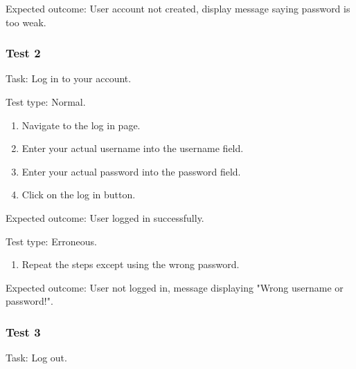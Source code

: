 {\sffamily Expected outcome:} User account not created, display
message saying password is too weak.\\

{\color{gray} \hrulefill}

\vspace{0.2cm}

\subsubsection{Test 2}

{\sffamily Task:} Log in to your account.\\

{\color{gray} \hrulefill}

{\sffamily Test type: Normal.}\\

\begin{enumerate}
  \item Navigate to the log in page.
  \item Enter your actual username into the username field.
  \item Enter your actual password into the password field.
  \item Click on the log in button.
\end{enumerate}

{\sffamily Expected outcome:} User logged in successfully. \\

{\color{gray} \hrulefill}

{\sffamily Test type: Erroneous.}\\

\begin{enumerate}
  \item Repeat the steps except using the wrong password.
\end{enumerate}

{\sffamily Expected outcome:} User not logged in,
message displaying "Wrong username or password!". \\

{\color{gray} \hrulefill}

\vspace{0.2cm}

\subsubsection{Test 3}

{\sffamily Task:} Log out.\\

